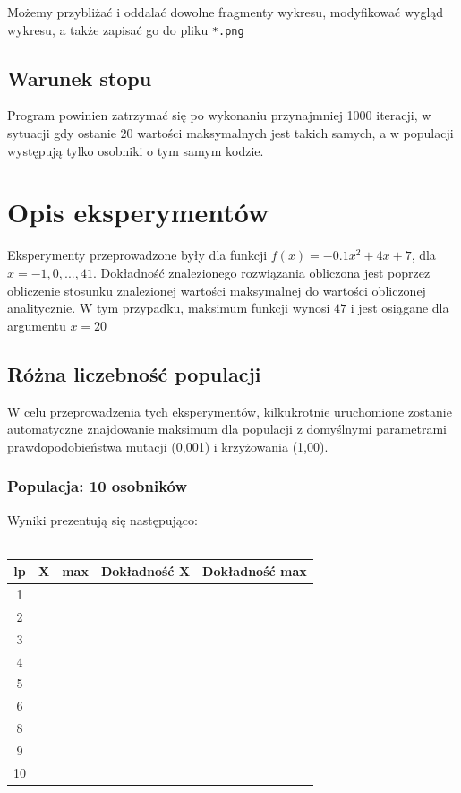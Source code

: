 \documentclass[a4paper,11pt]{article}
\begin{document}
			Możemy przybliżać i oddalać dowolne fragmenty wykresu, modyfikować wygląd wykresu, a także zapisać go do pliku \texttt{*.png}
			
		\subsection{Warunek stopu}
		Program powinien zatrzymać się po wykonaniu przynajmniej 1000 iteracji, w sytuacji gdy ostanie 20 wartości maksymalnych jest takich samych, a w populacji występują tylko osobniki o tym samym kodzie.
		
	\section{Opis eksperymentów}
	Eksperymenty przeprowadzone były dla funkcji $f(x) = -0.1x^2 + 4x + 7$, dla $x = -1, 0, ..., 41$. Dokładność znalezionego rozwiązania obliczona jest poprzez obliczenie stosunku znalezionej wartości maksymalnej do wartości obliczonej analitycznie. W tym przypadku, maksimum funkcji wynosi $47$ i jest osiągane dla argumentu $x = 20$
	
		\subsection{Różna liczebność populacji}
			W celu przeprowadzenia tych eksperymentów, kilkukrotnie uruchomione zostanie  automatyczne znajdowanie maksimum dla populacji z domyślnymi parametrami prawdopodobieństwa mutacji (0,001) i krzyżowania (1,00).
			\subsubsection{Populacja: 10 osobników}
				Wyniki prezentują się następująco:\\~\\
				\begin{tabular}{|c|c|c|c|c|}
					\hline 
					lp & X & max & Dokładność X & Dokładność max\\
					\hline
					1 &  &  &  & \\
					\hline
					2 &  &  &  & \\
					\hline
					3 &  &  &  & \\
					\hline
					4 &  &  &  & \\
					\hline
					5 &  &  &  & \\
					\hline
					6 &  &  &  & \\
					\hline
					8 &  &  &  & \\
					\hline
					9 &  &  &  & \\
					\hline
					10 &  &  &  & \\
					\hline
				\end{tabular} 
\end{document}
